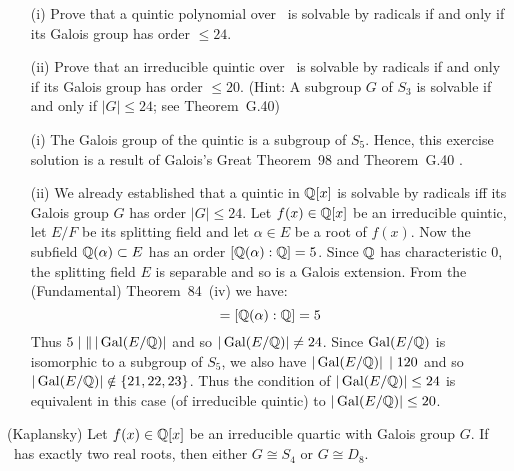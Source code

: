 \begin{myenumerate}
\item
\begin{excopy}
\begin{itemize}
 \item[(i)]
   Prove that a quintic polynomial over \Q\ is solvable by radicals
   if and only if its Galois group has order \(\leq 24\).
 \item[(ii)]
   Prove that an irreducible quintic over \Q\ is solvable by radicals
   if and only if its Galois group has order \(\leq 20\).
   (Hint: A subgroup $G$ of \(S_3\) is solvable if and only if \(|G|\leq 24\);
    see Theorem~G.40)
\end{itemize}
\end{excopy}

\begin{itemize}
 \item[(i)]
 The Galois group of the quintic is a subgroup of \(S_5\).
 Hence, this exercise solution is a result of Galois's Great Theorem~98
 and Theorem~G.40 \cite{Rotman98}.

 \item[(ii)]
 We already established that a quintic in \(\mathbb{Q}[x]\) is solvable by radicals
 iff its Galois group $G$ has order \(|G| \leq 24\).
 Let \(f(x)\in \mathbb{Q}[x]\) be an irreducible quintic, let \(E/F\)
 be its splitting field
 and let \(\alpha\in E\) be a root of \(f(x)\).
 Now the subfield \(\mathbb{Q}(\alpha)\subset E\) has an order
 \([\mathbb{Q}(\alpha):\mathbb{Q}] = 5\).
 Since \(\mathbb{Q}\) has characteristic $0$, the splitting field $E$
 is separable and so is a Galois extension. From the
 (Fundamental) Theorem~84~(iv) \cite{Rotman98}
 we have:
 \begin{equation*}
   [\Gal(E/\Q):\Gal(E/\Q(\alpha)\,)] = [\Q(\alpha) : \Q] = 5
 \end{equation*}
 Thus \(5\mid \|\, |\mathop{\rm Gal}\nolimits(E/\mathbb{Q})|\) and so \(|\mathop{\rm Gal}\nolimits(E/\mathbb{Q})|\neq 24\).
 Since \(\mathop{\rm Gal}\nolimits(E/\mathbb{Q})\) is isomorphic to a subgroup of \(S_5\),
 we also have \(|\mathop{\rm Gal}\nolimits(E/\mathbb{Q})|\,\mid 120\) and so
 \(|\mathop{\rm Gal}\nolimits(E/\mathbb{Q})| \notin\{21,22,23\}\). Thus the condition of
 \(|\mathop{\rm Gal}\nolimits(E/\mathbb{Q})| \leq 24\) is equivalent in this case (of irreducible quintic)
 to \(|\mathop{\rm Gal}\nolimits(E/\mathbb{Q})| \leq 20\).
\end{itemize}

\item
\begin{excopy}
(Kaplansky)
Let \(f(x)\in \mathbb{Q}[x]\) be an irreducible quartic with
Galois group $G$. If \fx\ has exactly two real roots, then either
\(G \cong S_4\) or \(G \cong D_8\).
\end{excopy}


\end{myenumerate}
